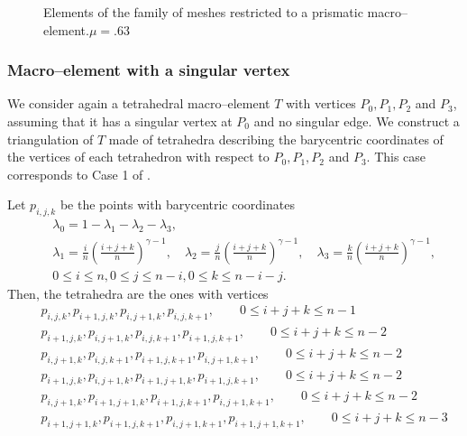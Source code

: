 \def\col{black}
\def\height{0}
\def\twoPi{360}
\begin{figure}[!h]\centering
  \subfloat
  {
    \hspace{1cm}
    \hspace{1cm}
  }
  \caption{Elements of the family of
    meshes restricted to a prismatic macro--element.$\mu = .63$}
  \label{prismatic_macroelements}
\end{figure}

\subsubsection{Macro--element with a singular vertex}

We consider again a tetrahedral macro--element $T$ with vertices $P_0, P_1, P_2$
and $P_3$, assuming that it has a singular vertex at $P_0$ and no singular edge.
We construct a triangulation of $T$ made of tetrahedra describing 
the barycentric coordinates of the vertices of each tetrahedron with respect
to $P_0, P_1, P_2$ and $P_3$. This case corresponds to Case 1 of \cite{AN}.

Let $p_{i,j,k}$ be the points with barycentric coordinates
\begin{eqnarray*}
&&\lambda_0=1-\lambda_1-\lambda_2-\lambda_3,\\[5pt]
&&\lambda_1=\frac in\left(\frac{i+j+k}n\right)^{\gamma-1},\quad
  \lambda_2=\frac jn\left(\frac{i+j+k}n\right)^{\gamma-1},\quad
  \lambda_3=\frac kn\left(\frac{i+j+k}n\right)^{\gamma-1},
\\[5pt] &&0\le i\le n, 0\le j\le n-i, 0\le k\le n-i-j.
\end{eqnarray*}
Then, the tetrahedra are the ones with vertices
\begin{eqnarray*}
&& p_{i,j,k}, p_{i+1,j,k}, p_{i,j+1,k}, p_{i,j,k+1}, \qquad 0\le i+j+k\le n-1\\
&& p_{i+1,j,k}, p_{i,j+1,k}, p_{i,j,k+1}, p_{i+1,j,k+1}, \qquad 0\le i+j+k\le n-2\\
&& p_{i,j+1,k}, p_{i,j,k+1}, p_{i+1,j,k+1}, p_{i,j+1,k+1}, \qquad 0\le i+j+k\le n-2\\
&& p_{i+1,j,k}, p_{i,j+1,k}, p_{i+1,j+1,k}, p_{i+1,j,k+1}, \qquad 0\le i+j+k\le n-2\\
&& p_{i,j+1,k}, p_{i+1,j+1,k}, p_{i+1,j,k+1}, p_{i,j+1,k+1}, \qquad 0\le i+j+k\le n-2\\
&& p_{i+1,j+1,k}, p_{i+1,j,k+1}, p_{i,j+1,k+1}, p_{i+1,j+1,k+1}, \qquad 0\le i+j+k\le n-3
\end{eqnarray*}


